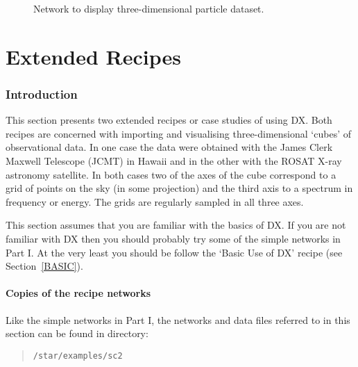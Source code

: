 \begin{figure}[htbp]

\begin{center}
\leavevmode
\epsfxsize=271pt
\end{center}

\caption[Network to display three-dimensional particle dataset.]{Network
to display three-dimensional particle dataset. \label{PARTNETF} }

\end{figure}


\cleardoublepage
\markboth{\stardocname}{\stardocname}
\part{Extended Recipes}
\markboth{\stardocname}{\stardocname}
\section{Introduction}

This section presents two extended recipes or case studies of using
DX.  Both recipes are concerned with importing and visualising
three-dimensional `cubes' of observational data.  In one case the data
were obtained with the James Clerk Maxwell Telescope (JCMT) in Hawaii
and in the other with the ROSAT X-ray astronomy satellite.  In both
cases two of the axes of the cube correspond to a grid of points on
the sky (in some projection) and the third axis to a spectrum in
frequency or energy.  The grids are regularly sampled in all three axes.

This section assumes that you are familiar with the basics of DX.  If
you are not familiar with DX then you should probably try some of
the simple networks in Part I.  At the very least you should be
follow the `Basic Use of DX' recipe (see Section~\ref{BASIC}).

\subsection{Copies of the recipe networks}

Like the simple networks in Part I, the networks and data files referred
to in this section can be found in directory:

\begin{quote}
{\tt /star/examples/sc2}
\end{quote}

